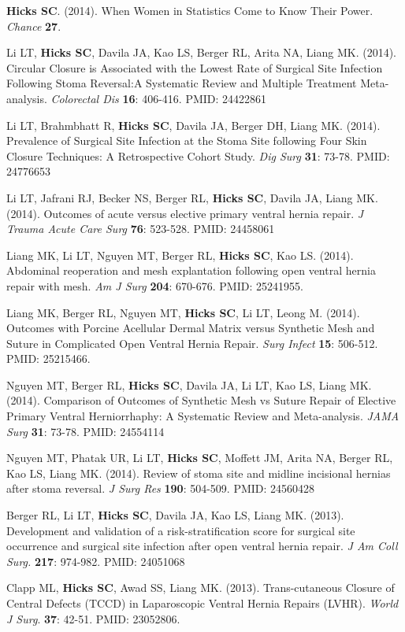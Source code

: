 \documentclass[10pt]{article}
\begin{document}
\begin{enumerate}[label= {[\arabic*]}]
\item {\bf Hicks SC}. (2014). When Women in Statistics Come to Know Their Power. {\it Chance} {\bf 27}. 
\item Li LT, {\bf Hicks SC}, Davila JA, Kao LS, Berger RL, Arita NA, Liang MK. (2014). Circular Closure is Associated with the Lowest Rate of Surgical Site Infection Following Stoma Reversal:A Systematic Review and Multiple Treatment Meta-analysis. {\it Colorectal Dis} {\bf 16}: 406-416. PMID: 24422861
\item Li LT, Brahmbhatt R, {\bf Hicks SC}, Davila JA, Berger DH, Liang MK. (2014). Prevalence of Surgical Site Infection at the Stoma Site following Four Skin Closure Techniques: A Retrospective Cohort Study. {\it Dig Surg} {\bf 31}: 73-78. PMID: 24776653
\item Li LT, Jafrani RJ, Becker NS, Berger RL,  {\bf Hicks SC}, Davila JA, Liang MK. (2014). Outcomes of acute versus elective primary ventral hernia repair. {\it J Trauma Acute Care Surg} {\bf 76}: 523-528. PMID: 24458061
\item Liang MK, Li LT, Nguyen MT, Berger RL, {\bf Hicks SC}, Kao LS. (2014). Abdominal reoperation and mesh explantation following open ventral hernia repair with mesh. {\it Am J Surg} {\bf 204}: 670-676. PMID: 25241955. 
\item Liang MK, Berger RL, Nguyen MT, {\bf Hicks SC}, Li LT, Leong M. (2014). Outcomes with Porcine Acellular Dermal Matrix versus Synthetic Mesh and Suture in Complicated Open Ventral Hernia Repair. {\it Surg Infect} {\bf 15}: 506-512. PMID: 25215466. 
\item Nguyen MT, Berger RL, {\bf Hicks SC}, Davila JA, Li LT, Kao LS, Liang MK. (2014). Comparison of Outcomes of Synthetic Mesh vs Suture Repair of Elective Primary Ventral Herniorrhaphy: A Systematic Review and Meta-analysis. {\it JAMA Surg} {\bf 31}: 73-78. PMID: 24554114 
\item Nguyen MT, Phatak UR, Li LT, {\bf Hicks SC}, Moffett JM, Arita NA, Berger RL, Kao LS, Liang MK. (2014). Review of stoma site and midline incisional hernias after stoma reversal. {\it J Surg Res} {\bf 190}: 504-509. PMID: 24560428 
\item Berger RL, Li LT, {\bf Hicks SC}, Davila JA, Kao LS, Liang MK. (2013). Development and validation of a risk-stratification score for surgical site occurrence and surgical site infection after open ventral hernia repair. {\it J Am Coll Surg.} {\bf 217}: 974-982. PMID: 24051068
\item Clapp ML, \textbf{Hicks SC}, Awad SS, Liang MK. (2013). Trans-cutaneous Closure of Central Defects (TCCD) in Laparoscopic Ventral Hernia Repairs (LVHR). {\it World J Surg}. {\bf 37}: 42-51. PMID: 23052806.

\end{enumerate}
\end{document}
